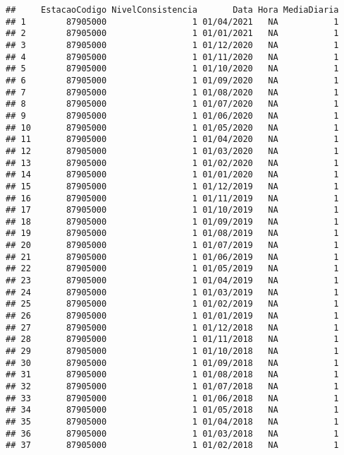 \documentclass[
]{article}
\begin{document}
\begin{verbatim}
##     EstacaoCodigo NivelConsistencia       Data Hora MediaDiaria
## 1        87905000                 1 01/04/2021   NA           1
## 2        87905000                 1 01/01/2021   NA           1
## 3        87905000                 1 01/12/2020   NA           1
## 4        87905000                 1 01/11/2020   NA           1
## 5        87905000                 1 01/10/2020   NA           1
## 6        87905000                 1 01/09/2020   NA           1
## 7        87905000                 1 01/08/2020   NA           1
## 8        87905000                 1 01/07/2020   NA           1
## 9        87905000                 1 01/06/2020   NA           1
## 10       87905000                 1 01/05/2020   NA           1
## 11       87905000                 1 01/04/2020   NA           1
## 12       87905000                 1 01/03/2020   NA           1
## 13       87905000                 1 01/02/2020   NA           1
## 14       87905000                 1 01/01/2020   NA           1
## 15       87905000                 1 01/12/2019   NA           1
## 16       87905000                 1 01/11/2019   NA           1
## 17       87905000                 1 01/10/2019   NA           1
## 18       87905000                 1 01/09/2019   NA           1
## 19       87905000                 1 01/08/2019   NA           1
## 20       87905000                 1 01/07/2019   NA           1
## 21       87905000                 1 01/06/2019   NA           1
## 22       87905000                 1 01/05/2019   NA           1
## 23       87905000                 1 01/04/2019   NA           1
## 24       87905000                 1 01/03/2019   NA           1
## 25       87905000                 1 01/02/2019   NA           1
## 26       87905000                 1 01/01/2019   NA           1
## 27       87905000                 1 01/12/2018   NA           1
## 28       87905000                 1 01/11/2018   NA           1
## 29       87905000                 1 01/10/2018   NA           1
## 30       87905000                 1 01/09/2018   NA           1
## 31       87905000                 1 01/08/2018   NA           1
## 32       87905000                 1 01/07/2018   NA           1
## 33       87905000                 1 01/06/2018   NA           1
## 34       87905000                 1 01/05/2018   NA           1
## 35       87905000                 1 01/04/2018   NA           1
## 36       87905000                 1 01/03/2018   NA           1
## 37       87905000                 1 01/02/2018   NA           1

\end{verbatim}
\end{document}
